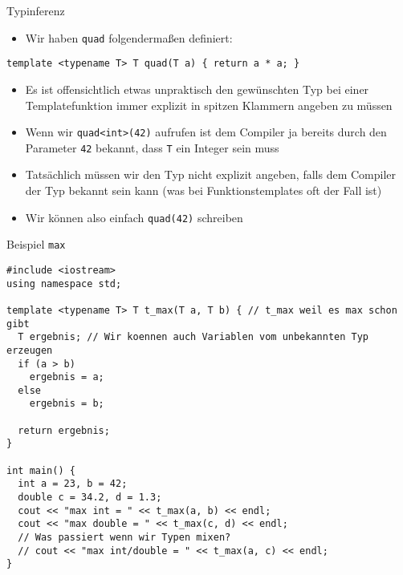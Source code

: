 \documentclass[presentation]{beamer}
\begin{document}
\begin{frame}[label={sec:org58caafc},fragile]{Typinferenz}
 \begin{itemize}
\item Wir haben {\color{solarizedYellow}\verb!quad!} folgendermaßen definiert:
\end{itemize}
\begin{verbatim}
template <typename T> T quad(T a) { return a * a; }
\end{verbatim}
\begin{itemize}
\item Es ist offensichtlich etwas unpraktisch den gewünschten Typ bei
einer Templatefunktion immer explizit in spitzen Klammern angeben zu
müssen
\item Wenn wir {\color{solarizedYellow}\verb!quad<int>(42)!} aufrufen ist dem Compiler ja bereits durch
den Parameter {\color{solarizedYellow}\verb!42!} bekannt, dass {\color{solarizedYellow}\verb!T!} ein Integer sein muss
\item Tatsächlich müssen wir den Typ nicht explizit angeben, falls dem
Compiler der Typ bekannt sein kann (was bei Funktionstemplates oft
der Fall ist)
\item Wir können also einfach {\color{solarizedYellow}\verb!quad(42)!} schreiben
\end{itemize}
\end{frame}
\begin{frame}[label={sec:org989d6c4},fragile]{Beispiel {\color{solarizedYellow}\texttt{max}}}
 \begin{verbatim}
#include <iostream>
using namespace std;

template <typename T> T t_max(T a, T b) { // t_max weil es max schon gibt
  T ergebnis; // Wir koennen auch Variablen vom unbekannten Typ erzeugen
  if (a > b)
    ergebnis = a;
  else
    ergebnis = b;

  return ergebnis;
}

int main() {
  int a = 23, b = 42;
  double c = 34.2, d = 1.3;
  cout << "max int = " << t_max(a, b) << endl;
  cout << "max double = " << t_max(c, d) << endl;
  // Was passiert wenn wir Typen mixen?
  // cout << "max int/double = " << t_max(a, c) << endl;
}
\end{verbatim}
\end{frame}
\end{document}
